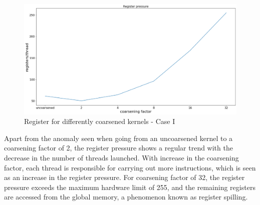 \begin{figure}[ht]
	\centering
	\includegraphics[scale=0.30]{Pictures/plots/good_improvement_coarsening/register pressure.png}
	\caption{\small Register for differently coarsened kernels - Case I}
\end{figure}

    

Apart from the anomaly seen when going from an uncoarsened kernel to a coarsening factor of 2, the register pressure shows a regular trend with the decrease in the number of threads launched. With increase in the coarsening factor, each thread is responsible for carrying out more instructions, which is seen as an increase in the register pressure. For coarsening factor of 32, the register pressure exceeds the maximum hardware limit of 255, and the remaining registers are accessed from the global memory, a phenomenon known as register spilling.

